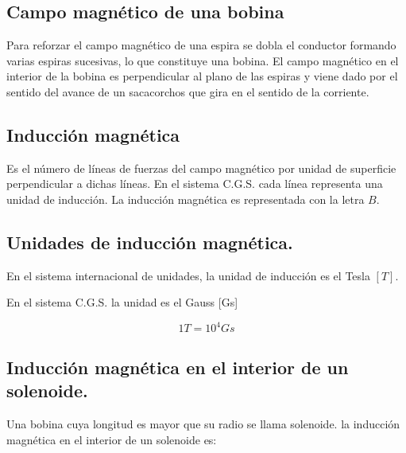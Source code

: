\subsection{Campo magnético de una bobina}

Para reforzar el campo magnético de una espira se dobla el conductor formando varias espiras sucesivas, lo que constituye una bobina. El campo magnético en el interior de la bobina es perpendicular al plano de las espiras y viene dado por el sentido del avance de un sacacorchos que gira en el sentido de la corriente.

\subsection{Inducción magnética}

Es el número de líneas de fuerzas del campo magnético por unidad de superficie perpendicular a dichas líneas.  En el sistema C.G.S. cada línea representa una unidad de inducción.
La inducción magnética es representada con la letra $B$.

\subsection{Unidades de inducción magnética.}

En el sistema internacional de unidades, la unidad de inducción es el Tesla $[T]$.

En el sistema C.G.S. la unidad es el Gauss [Gs] 

\begin{equation*}
    1T=10^4Gs
\end{equation*}

\subsection{Inducción magnética en el interior de un solenoide.}

Una bobina cuya longitud es mayor que su radio se llama solenoide. la inducción magnética en el interior de un solenoide es:


